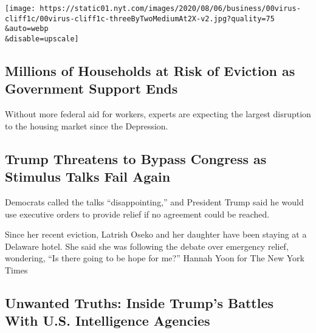 \href{/2020/08/08/business/economy/lost-unemployment-benefits.html}{}

\texttt{[image: https://static01.nyt.com/images/2020/08/06/business/00virus-cliff1c/00virus-cliff1c-threeByTwoMediumAt2X-v2.jpg?quality=75\\\&auto=webp\\\&disable=upscale]}

\href{/2020/08/07/business/economy/housing-economy-eviction-renters.html}{}

\hypertarget{millions-of-households-at-risk-of-eviction-as-government-support-ends}{%
\subsection{Millions of Households at Risk of Eviction as Government
Support
Ends}\label{millions-of-households-at-risk-of-eviction-as-government-support-ends}}

Without more federal aid for workers, experts are expecting the largest
disruption to the housing market since the Depression.

\href{/2020/08/07/us/politics/trump-congress-stimulus.html}{}

\hypertarget{trump-threatens-to-bypass-congress-as-stimulus-talks-fail-again}{%
\subsection{Trump Threatens to Bypass Congress as Stimulus Talks Fail
Again}\label{trump-threatens-to-bypass-congress-as-stimulus-talks-fail-again}}

Democrats called the talks ``disappointing,'' and President Trump said
he would use executive orders to provide relief if no agreement could be
reached.

\href{/2020/08/08/business/economy/lost-unemployment-benefits.html}{}

Since her recent eviction, Latrish Oseko and her daughter have been
staying at a Delaware hotel. She said she was following the debate over
emergency relief, wondering, ``Is there going to be hope for me?''
Hannah Yoon for The New York Times

\href{/2020/08/08/magazine/us-russia-intelligence.html}{}

\hypertarget{unwanted-truths-inside-trumps-battles-with-us-intelligence-agencies}{%
\subsection{Unwanted Truths: Inside Trump's Battles With U.S.
Intelligence
Agencies}\label{unwanted-truths-inside-trumps-battles-with-us-intelligence-agencies}}

